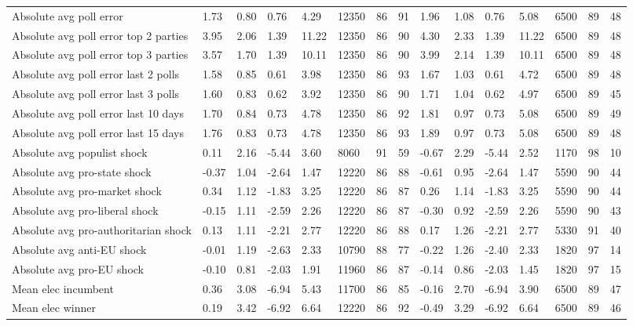 \begin{longtable}{lllllllllllllll}
Absolute avg poll error & 1.73 & 0.80 & 0.76 & 4.29 & 12350 & 86 & 91 & 1.96 & 1.08 & 0.76 & 5.08 & 6500 & 89 & 48\\
Absolute avg poll error top 2 parties & 3.95 & 2.06 & 1.39 & 11.22 & 12350 & 86 & 90 & 4.30 & 2.33 & 1.39 & 11.22 & 6500 & 89 & 48\\
Absolute avg poll error top 3 parties & 3.57 & 1.70 & 1.39 & 10.11 & 12350 & 86 & 90 & 3.99 & 2.14 & 1.39 & 10.11 & 6500 & 89 & 48\\
\addlinespace
Absolute avg poll error last 2 polls & 1.58 & 0.85 & 0.61 & 3.98 & 12350 & 86 & 93 & 1.67 & 1.03 & 0.61 & 4.72 & 6500 & 89 & 48\\
Absolute avg poll error last 3 polls & 1.60 & 0.83 & 0.62 & 3.92 & 12350 & 86 & 90 & 1.71 & 1.04 & 0.62 & 4.97 & 6500 & 89 & 45\\
Absolute avg poll error last 10 days & 1.70 & 0.84 & 0.73 & 4.78 & 12350 & 86 & 92 & 1.81 & 0.97 & 0.73 & 5.08 & 6500 & 89 & 49\\
Absolute avg poll error last 15 days & 1.76 & 0.83 & 0.73 & 4.78 & 12350 & 86 & 93 & 1.89 & 0.97 & 0.73 & 5.08 & 6500 & 89 & 48\\
Absolute avg populist shock & 0.11 & 2.16 & -5.44 & 3.60 & 8060 & 91 & 59 & -0.67 & 2.29 & -5.44 & 2.52 & 1170 & 98 & 10\\
\addlinespace
Absolute avg pro-state shock & -0.37 & 1.04 & -2.64 & 1.47 & 12220 & 86 & 88 & -0.61 & 0.95 & -2.64 & 1.47 & 5590 & 90 & 44\\
Absolute avg pro-market shock & 0.34 & 1.12 & -1.83 & 3.25 & 12220 & 86 & 87 & 0.26 & 1.14 & -1.83 & 3.25 & 5590 & 90 & 44\\
Absolute avg pro-liberal shock & -0.15 & 1.11 & -2.59 & 2.26 & 12220 & 86 & 87 & -0.30 & 0.92 & -2.59 & 2.26 & 5590 & 90 & 43\\
Absolute avg pro-authoritarian shock & 0.13 & 1.11 & -2.21 & 2.77 & 12220 & 86 & 88 & 0.17 & 1.26 & -2.21 & 2.77 & 5330 & 91 & 40\\
Absolute avg anti-EU shock & -0.01 & 1.19 & -2.63 & 2.33 & 10790 & 88 & 77 & -0.22 & 1.26 & -2.40 & 2.33 & 1820 & 97 & 14\\
\addlinespace
Absolute avg pro-EU shock & -0.10 & 0.81 & -2.03 & 1.91 & 11960 & 86 & 87 & -0.14 & 0.86 & -2.03 & 1.45 & 1820 & 97 & 15\\
Mean elec incumbent & 0.36 & 3.08 & -6.94 & 5.43 & 11700 & 86 & 85 & -0.16 & 2.70 & -6.94 & 3.90 & 6500 & 89 & 47\\
Mean elec winner & 0.19 & 3.42 & -6.92 & 6.64 & 12220 & 86 & 92 & -0.49 & 3.29 & -6.92 & 6.64 & 6500 & 89 & 46\\

\end{longtable}
